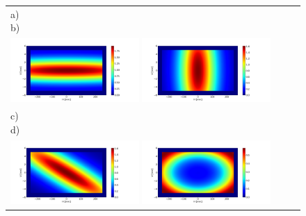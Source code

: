 \documentclass[aps,pra,showpacs,twocolumn,amsmath,amssymb,superscriptaddress,nofootinbib]{revtex4}
\begin{document}
  

\thispagestyle{empty}

\begin{figure} 
\begin{center}
\begin{tabular}{l} 
   a)~~~~~~~~~~~~~~~~~~~~~~~~~~~~~~~~~~~~~~~~~~~~
   b)~~~~~~~~~~~~~~~~~~~~~~~~~~~~~~~~~~~~~~~~~~~~\\
   \includegraphics[width=0.45\textwidth]{figures/powerdensityKv.png}
   \includegraphics[width=0.45\textwidth]{figures/powerdensityKh.png}\\
   c)~~~~~~~~~~~~~~~~~~~~~~~~~~~~~~~~~~~~~~~~~~~~
   d)~~~~~~~~~~~~~~~~~~~~~~~~~~~~~~~~~~~~~~~~~~~~\\
   \includegraphics[width=0.45\textwidth]{figures/powerdensityKhKv.png} 
      \includegraphics[width=0.45\textwidth]{figures/powerdensityKhKv90.png}
\end{tabular}
\end{center}
\end{figure}
\end{document}
